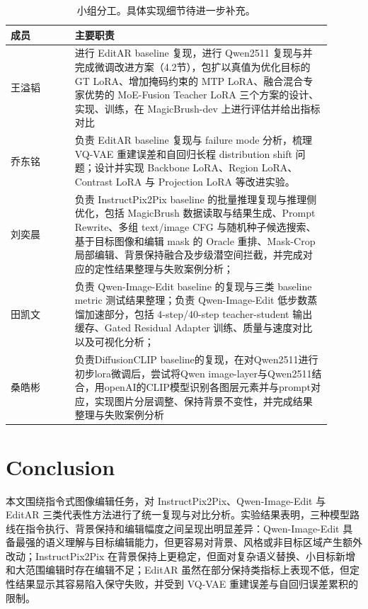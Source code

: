 \documentclass[UTF8,11pt,a4paper,fontset=fandol]{ctexart}
\begin{document}
\begin{table}[ht]
\centering
\small
\caption{小组分工。具体实现细节待进一步补充。}
\label{tab:team-contributions}
\begin{tabular}{>{\centering\arraybackslash}p{0.18\linewidth}p{0.72\linewidth}}
\toprule
成员 & 主要职责 \\
\midrule
王溢韬 & 进行 EditAR baseline 复现，进行 Qwen2511 复现与并完成微调改进方案（4.2节），包扩以真值为优化目标的 GT LoRA、增加掩码约束的 MTP LoRA、融合混合专家优势的 MoE-Fusion Teacher LoRA 三个方案的设计、实现、训练，在 MagicBrush-dev 上进行评估并给出指标对比\\
\midrule
乔东铭 & 负责 EditAR baseline 复现与 failure mode 分析，梳理 VQ-VAE 重建误差和自回归长程 distribution shift 问题；设计并实现 Backbone LoRA、Region LoRA、Contrast LoRA 与 Projection LoRA 等改进实验。 \\
\midrule
刘奕晨 & 负责 InstructPix2Pix baseline 的批量推理复现与推理侧优化，包括 MagicBrush 数据读取与结果生成、Prompt Rewrite、多组 text/image CFG 与随机种子候选搜索、基于目标图像和编辑 mask 的 Oracle 重排、Mask-Crop 局部编辑、背景保持融合及步级潜空间拦截，并完成对应的定性结果整理与失败案例分析； \\
\midrule
田凯文 & 负责 Qwen-Image-Edit baseline 的复现与三类 baseline metric 测试结果整理；负责 Qwen-Image-Edit 低步数蒸馏加速部分，包括 4-step/40-step teacher-student 输出缓存、Gated Residual Adapter 训练、质量与速度对比以及可视化分析；\\
\midrule
桑皓彬 & 负责DiffusionCLIP baseline的复现，在对Qwen2511进行初步lora微调后，尝试将Qwen image-layer与Qwen2511结合，用openAI的CLIP模型识别各图层元素并与prompt对应，实现图片分层调整、保持背景不变性，并完成结果整理与失败案例分析 \\
\bottomrule
\end{tabular}
\end{table}

\section{Conclusion}

本文围绕指令式图像编辑任务，对 InstructPix2Pix、Qwen-Image-Edit 与 EditAR 三类代表性方法进行了统一复现与对比分析。实验结果表明，三种模型路线在指令执行、背景保持和编辑幅度之间呈现出明显差异：Qwen-Image-Edit 具备最强的语义理解与目标编辑能力，但更容易对背景、风格或非目标区域产生额外改动；InstructPix2Pix 在背景保持上更稳定，但面对复杂语义替换、小目标新增和大范围编辑时存在编辑不足；EditAR 虽然在部分保持类指标上表现不低，但定性结果显示其容易陷入保守失败，并受到 VQ-VAE 重建误差与自回归误差累积的限制。
\end{document}

